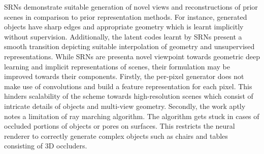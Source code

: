 \documentclass[11pt,letterpaper]{article}
\begin{document}
SRNs demonstrate suitable generation of novel views and reconstructions of prior scenes in comparison to prior representation methods. For instance, generated objects have sharp edges and appropriate geometry which is learnt implicitly without supervision. Additionally, the latent codes learnt by SRNs present a smooth transition depicting suitable interpolation of geometry and unsupervised representations. While SRNs are presenta novel viewpoint towards geometric deep learning and implicit representations of scenes, their formulation may be improved towards their components. Firstly, the per-pixel generator does not make use of convolutions and build a feature representation for each pixel. This hinders scalability of the scheme towards high-resolution scenes which consist of intricate details of objects and multi-view geometry. Secondly, the work aptly notes a limitation of ray marching algorithm. The algorithm gets stuck in cases of occluded portions of objects or pores on surfaces. This restricts the neural renderer to correctly generate complex objects such as chairs and tables consisting of 3D occluders. 
\end{document}
